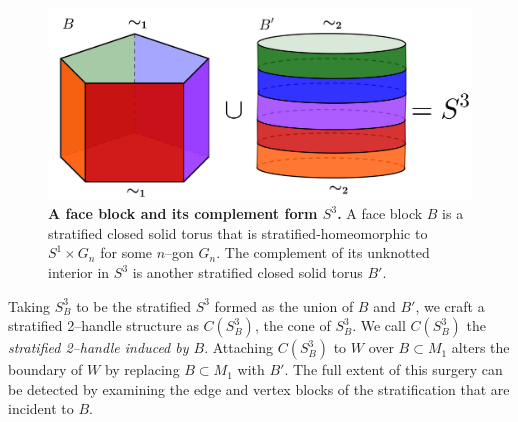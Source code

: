 \begin{figure}[h!]
	\centering
	\includegraphics[width=\textwidth]{figures/face-block-complement.png}
	\caption{
		\textbf{A face block and its complement form $S^3$.}
		A face block $B$ is a stratified closed solid torus that is stratified-homeomorphic to $S^1\times G_n$ for some $n$--gon $G_n$.
		The complement of its unknotted interior in $S^3$ is another stratified closed solid torus $B'$.
	}
	\label{fig:face-block-complement}
\end{figure}

Taking $S_B^3$ to be the stratified $S^3$ formed as the union of $B$ and $B'$, we craft a stratified 2--handle structure as $C(S_B^3)$, the cone of $S_B^3$.
We call $C(S_B^3)$ the \emph{stratified 2--handle induced by $B$}.
Attaching $C(S_B^3)$ to $W$ over $B\subset M_1$ alters the boundary of $W$ by replacing $B\subset M_1$ with $B'$.
The full extent of this surgery can be detected by examining the edge and vertex blocks of the stratification that are incident to $B$.

